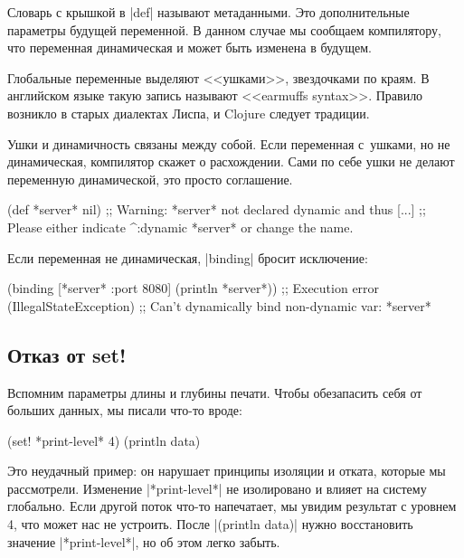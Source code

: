 Словарь с крышкой в \spverb|def| называют метаданными. Это дополнительные
параметры будущей переменной. В данном случае мы сообщаем компилятору, что
переменная динамическая и может быть изменена в будущем.

Глобальные переменные выделяют <<ушками>>, звездочками по краям. В
английском языке такую запись называют <<earmuffs syntax>>. Правило возникло в
старых диалектах Лиспа, и Clojure следует традиции.

Ушки и динамичность связаны между собой. Если переменная с~ушками, но не
динамическая, компилятор скажет о расхождении. Сами по себе ушки не делают
переменную динамической, это просто соглашение.

\begin{english}
  \begin{clojure}
(def *server* nil)
;; Warning: *server* not declared dynamic and thus [...]
;; Please either indicate ^:dynamic *server* or change the name.
  \end{clojure}
\end{english}

\noindent
Если переменная не динамическая, \spverb|binding| бросит исключение:

\begin{english}
  \begin{clojure}
(binding [*server* {:port 8080}]
  (println *server*))
;; Execution error (IllegalStateException)
;; Can't dynamically bind non-dynamic var: *server*
  \end{clojure}
\end{english}

\subsection{Отказ от set!}

Вспомним параметры длины и глубины печати. Чтобы обезапасить себя от больших
данных, мы писали что-то вроде:

\begin{english}
  \begin{clojure}
(set! *print-level* 4)
(println data)
  \end{clojure}
\end{english}

Это неудачный пример: он нарушает принципы изоляции и отката, которые мы
рассмотрели. Изменение \spverb|*print-level*| не изолировано и влияет на систему
глобально. Если другой поток что-то напечатает, мы увидим результат с уровнем 4,
что может нас не устроить. После \spverb|(println data)| нужно
восстановить значение \spverb|*print-level*|, но об этом легко забыть.

